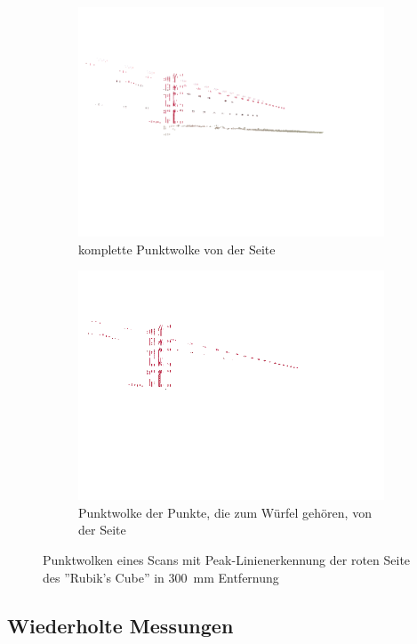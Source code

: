 \documentclass[ngerman,a4paper,parskip=half]{scrartcl}
\begin{document}
\begin{figure}[H]
\begin{subfigure}{0.45\textwidth}
		\includegraphics[width=\textwidth,frame]{includes/peak_red_pos1.png}
		\caption{komplette Punktwolke von der Seite \\ \mbox{}}
	\end{subfigure}
	\hfill
	\begin{subfigure}{0.45\textwidth}
		\includegraphics[width=\textwidth,frame]{includes/peak_only_red_pos1.png}
		\caption{Punktwolke der Punkte, die zum Würfel gehören, von der Seite}
	\end{subfigure}
	\caption{Punktwolken eines Scans mit Peak-Linienerkennung der roten Seite des ''Rubik's Cube'' in 300~mm Entfernung}
\end{figure}


\subsection{Wiederholte Messungen}
\label{sec:reps}
\end{document}
